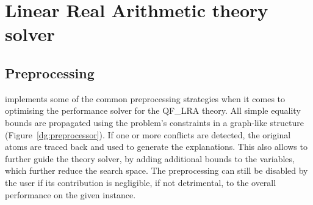 \documentclass[runningheads]{llncs}
\begin{document}
\section{Linear Real Arithmetic theory solver}
\label{sec:lra-theory-solver}

\subsection*{Preprocessing}

\dlinear implements some of the common preprocessing strategies when it comes to optimising the performance solver for the QF\_LRA theory.
All simple equality bounds are propagated using the problem's constraints in a graph-like structure (Figure~\ref{dg:preprocessor}).
If one or more conflicts are detected, the original atoms are traced back and used to generate the explanations.
This also allows to further guide the theory solver, by adding additional bounds to the variables, which further reduce the search space.
The preprocessing can still be disabled by the user if its contribution is negligible, if not detrimental, to the overall performance on the given instance.
\end{document}
